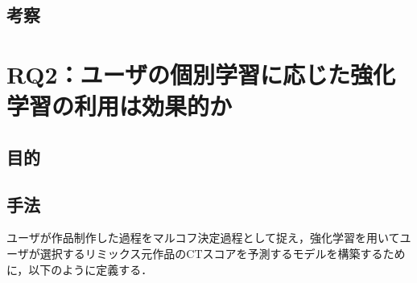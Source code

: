 \documentclass[submit,techrep,noauthor]{ipsj}
\begin{document}
\subsection{考察}



\section{RQ2：ユーザの個別学習に応じた強化学習の利用は効果的か}
\subsection{目的}

\subsection{手法}
ユーザが作品制作した過程をマルコフ決定過程として捉え，強化学習を用いてユーザが選択するリミックス元作品のCTスコアを予測するモデルを構築するために，以下のように定義する．
\end{document}
